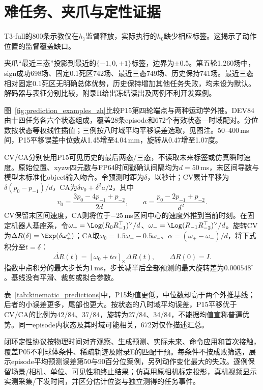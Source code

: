 \FloatBarrier


\clearpage
\section{难任务、夹爪与定性证据}
\label{app:qualitative}
T3-full的800条示教仅在$h_7$监督释放，实际执行的$h_0$缺少相应标签。这揭示了动作位置的监督覆盖缺口。

夹爪“最近三态”投影到最近的$\{-1,0,+1\}$标签，边界为$\pm0.5$。第五轮1,260场中，sign成功698场、固定0.1死区742场、最近三态749场、历史保持741场。最近三态相对固定0.1死区无明确总体优势，历史保持增加其他任务失败，均未设为默认。解码器与表征分别比较，附录H给出冻结读出及两例不利开发案例。

图~\ref{fig:prediction_examples_zh}比较P15第四轮端点与两种运动学外推。DEV84由十四任务各六个状态组成，覆盖28条episode和672个有效状态—时域配对。分位数按状态等权线性插值；三例按八时域平均平移误差选取，见图注。50--400\,ms间，P15平移误差中位数从1.45增至4.04\,mm，旋转从0.47增至1.07度。

CV/CA分别使用P15可见历史的最后两态/三态，不读取未来标签或仿真瞬时速度。原始位置、xyzw四元数与FP64时间戳确认间隔均为$d=50$\,ms，末区间导数与模型未标准化object输入吻合。令预测时距为$\delta$，以秒计；CV累计平移为$\delta(p_0-p_{-1})/d$，CA为$\delta v_0+\delta^2a/2$，其中
\[
v_0=\frac{3p_0-4p_{-1}+p_{-2}}{2d},\qquad
a=\frac{p_0-2p_{-1}+p_{-2}}{d^2}.
\]
CV保留末区间速度，CA则将位于$-25$\,ms区间中心的速度外推到当前时刻。在固定机器人基座系，令$\omega_+=\Log(R_0R_{-1}^{\top})^\vee/d$、$\omega_-=\Log(R_{-1}R_{-2}^{\top})^\vee/d$。旋转CV为$\Delta R(\delta)=\Exp(\delta\omega_+^\wedge)$；CA取$\omega_0=1.5\omega_+-0.5\omega_-$、$\alpha=(\omega_+-\omega_-)/d$，将下式积分至$t=\delta$：
\[
\dot{\Delta R}(t)=[\omega_0+t\alpha]_\times\Delta R(t),\qquad \Delta R(0)=I.
\]
指数中点积分的最大步长为1\,ms，步长减半后全部预测的最大旋转差为$0.000548^\circ$。基线没有平滑、裁剪或拟合参数。


表~\ref{tab:kinematic_predictions}中，P15均值更低，中位数却高于两个外推基线；后者的小误差更多，尾部也更大。按状态的八时域平均误差，P15平移优于CV/CA的比例为42/84、37/84，旋转为27/84、34/84，不能据均值宣称普遍优势。同一episode内状态及其时域可能相关，672对仅作描述汇总。

闭环定性协议按物理时间对齐观察、生成预测、实际未来、命令应用和首次接触，覆盖P05不利球体条件、稀疏轨迹及附录E的匹配干预。每条件不按成败筛选，展示episode平均预测误差第50与90百分位案例，另列动作变化最大的失败。逐例保留场景/相机、单位、可见性和终止结果；仿真用原相机标定投影，真机视频显示实测采集/下发时间，并区分估计位姿与独立测得的任务事件。

